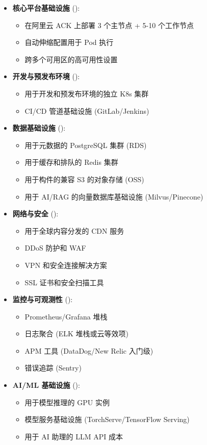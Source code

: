 \documentclass[11点, A4纸, 单面]{article}
\begin{document}
\begin{itemize}
    \item \textbf{核心平台基础设施} ():
    \begin{itemize}
        \item 在阿里云 ACK 上部署 3 个主节点 + 5-10 个工作节点
        \item 自动伸缩配置用于 Pod 执行
        \item 跨多个可用区的高可用性设置
    \end{itemize}
    
    \item \textbf{开发与预发布环境} ():
    \begin{itemize}
        \item 用于开发和预发布环境的独立 K8s 集群
        \item CI/CD 管道基础设施 (GitLab/Jenkins)
    \end{itemize}
    
    \item \textbf{数据基础设施} ():
    \begin{itemize}
        \item 用于元数据的 PostgreSQL 集群 (RDS)
        \item 用于缓存和排队的 Redis 集群
        \item 用于构件的兼容 S3 的对象存储 (OSS)
        \item 用于 AI/RAG 的向量数据库基础设施 (Milvus/Pinecone)
    \end{itemize}
    
    \item \textbf{网络与安全} ():
    \begin{itemize}
        \item 用于全球内容分发的 CDN 服务
        \item DDoS 防护和 WAF
        \item VPN 和安全连接解决方案
        \item SSL 证书和安全扫描工具
    \end{itemize}
    
    \item \textbf{监控与可观测性} ():
    \begin{itemize}
        \item Prometheus/Grafana 堆栈
        \item 日志聚合 (ELK 堆栈或云等效项)
        \item APM 工具 (DataDog/New Relic 入门级)
        \item 错误追踪 (Sentry)
    \end{itemize}
    
    \item \textbf{AI/ML 基础设施} ():
    \begin{itemize}
        \item 用于模型推理的 GPU 实例
        \item 模型服务基础设施 (TorchServe/TensorFlow Serving)
        \item 用于 AI 助理的 LLM API 成本
    \end{itemize}
\end{itemize}
\end{document}
